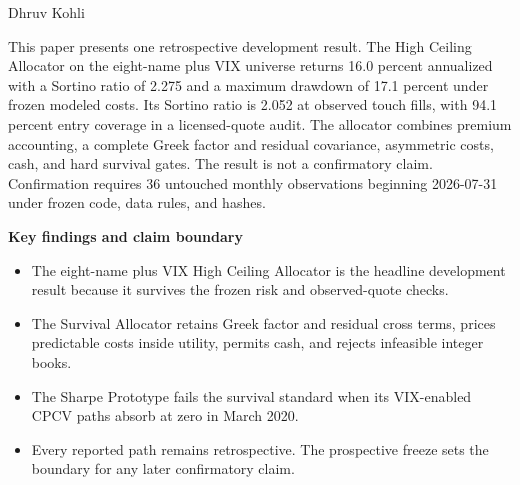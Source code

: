 \documentclass[11pt]{article}
\theoremstyle{definition}
\theoremstyle{remark}
\begin{document}
\thispagestyle{firstpage}

\vspace*{0.35cm}

\vspace{0.28cm}

\noindent Dhruv Kohli

\vspace{0.42cm}

This paper presents one retrospective development result. The High Ceiling Allocator on
the eight-name plus VIX universe returns 16.0 percent annualized with a Sortino ratio of
2.275 and a maximum drawdown of 17.1 percent under frozen modeled costs. Its Sortino ratio
is 2.052 at observed touch fills, with 94.1 percent entry coverage in a licensed-quote
audit. The allocator combines premium accounting, a complete Greek factor and residual
covariance, asymmetric costs, cash, and hard survival gates. The result is not a
confirmatory claim. Confirmation requires 36 untouched monthly observations beginning
2026-07-31 under frozen code, data rules, and hashes.

\vspace{0.26cm}
\noindent\colorbox{impactshade}{%
  \begin{minipage}{0.94\textwidth}
  \textbf{\color{journalgreen} Key findings and claim boundary}
  \begin{itemize}
    \item The eight-name plus VIX High Ceiling Allocator is the headline development
    result because it survives the frozen risk and observed-quote checks.
    \item The Survival Allocator retains Greek factor and residual cross terms, prices
    predictable costs inside utility, permits cash, and rejects infeasible integer books.
    \item The Sharpe Prototype fails the survival standard when its VIX-enabled CPCV paths
    absorb at zero in March 2020.
    \item Every reported path remains retrospective. The prospective freeze sets the
    boundary for any later confirmatory claim.
  \end{itemize}
  \end{minipage}}
\end{document}
